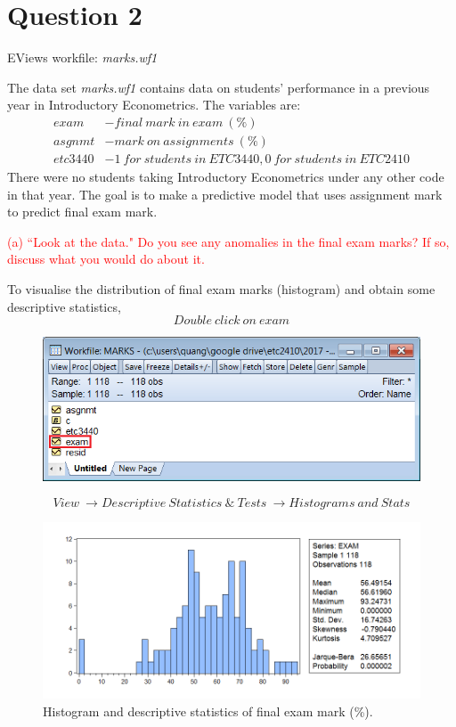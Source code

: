 \documentclass[12pt]{report}
\begin{document}
\newpage
\section*{Question 2}
\noindent EViews workfile: \textit{marks.wf1}

\noindent The data set \textit{marks.wf1} contains data on students’ performance in a previous year in Introductory Econometrics. The variables are:
\begin{align*}
	exam &- final\ mark\ in\ exam\ (\%) \\
	asgnmt &- mark\ on\ assignments\ (\%) \\
	etc3440 &- 1\ for\ students\ in\ ETC3440, 0\ for\ students\ in\ ETC2410
\end{align*}
\noindent There were no students taking Introductory Econometrics under any other code in that year. The goal is to make a predictive model that uses assignment mark to predict final exam mark.

\noindent \textcolor{red}{(a) ``Look at the data." Do you see any anomalies in the final exam marks? If so, discuss what you would do about it.}

\noindent To visualise the distribution of final exam marks (histogram) and obtain some descriptive statistics,
$$Double\ click\ on\ exam$$
\begin{figure}[H]
	\centering
	\includegraphics{q1_1}
\end{figure}
\vspace{-\baselineskip}
$$View\ \to Descriptive\ Statistics\ \&\ Tests\ \to Histograms\ and\ Stats$$
\begin{figure}[H]
	\centerline{\includegraphics{q1_2}}
	\caption{Histogram and descriptive statistics of final exam mark (\%).}
\end{figure}
\vspace{-\baselineskip}
\end{document}
